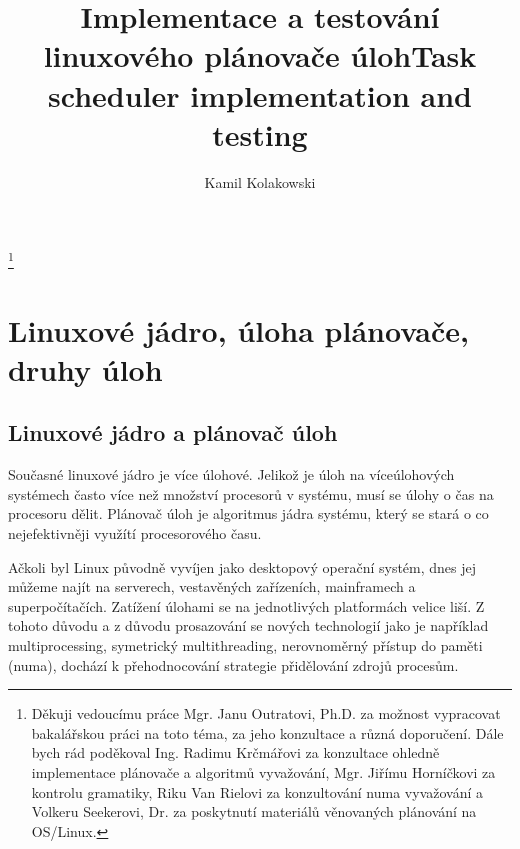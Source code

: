 \documentclass[
  field=ainfk,
  biblatex,
  glossaries,
  index
]{kidiplom}
\begin{document}
\title{Implementace a testování linuxového plánovače úloh}
\title[english]{Task scheduler implementation and testing}

\author{Kamil Kolakowski}



\thanks{Děkuji vedoucímu práce Mgr. Janu Outratovi, Ph.D. za možnost vypracovat bakalářskou práci na toto téma, za jeho konzultace a různá doporučení. Dále bych rád poděkoval Ing. Radimu Krčmářovi za konzultace ohledně implementace plánovače a algoritmů vyvažování, Mgr. Jiřímu Horníčkovi za kontrolu gramatiky, Riku Van Rielovi za konzultování numa vyvažování a Volkeru Seekerovi, Dr. za poskytnutí materiálů věnovaných plánování na OS/Linux.}




\maketitle

\section{Linuxové jádro, úloha plánovače, druhy úloh}

\subsection{Linuxové jádro a plánovač úloh}

Současné linuxové jádro je více úlohové. Jelikož je úloh na víceúlohových systémech často více než množství procesorů v systému, musí se úlohy o čas na procesoru dělit.
Plánovač úloh je algoritmus jádra systému, který se stará o co nejefektivněji využítí procesorového času.

Ačkoli byl Linux původně vyvíjen jako desktopový operační systém, dnes jej můžeme najít na serverech, vestavěných zařízeních, mainframech a superpočítačích. Zatížení úlohami se na jednotlivých platformách velice liší. Z tohoto důvodu a z důvodu prosazování se nových technologií jako je například multiprocessing, symetrický multithreading, nerovnoměrný přístup do paměti (numa), dochází k přehodnocování strategie přidělování zdrojů procesům. 
\end{document}
